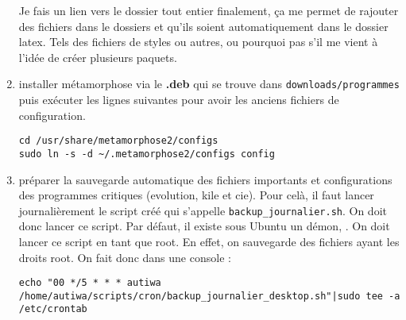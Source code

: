 \documentclass[a4paper,twoside]{article}
\begin{document}
\begin{enumerate}
\begin{remarque}
Je fais un lien vers le dossier tout entier finalement, ça me permet de rajouter des fichiers dans le dossiers et qu'ils soient automatiquement dans le dossier latex. Tels des fichiers de styles ou autres, ou pourquoi pas s'il me vient à l'idée de créer plusieurs paquets.
\end{remarque}
\item installer métamorphose via le \textbf{.deb} qui se trouve dans \texttt{downloads/programmes} puis exécuter les lignes suivantes pour avoir les anciens fichiers de configuration.
\begin{verbatim}
cd /usr/share/metamorphose2/configs
sudo ln -s -d ~/.metamorphose2/configs config
\end{verbatim}
\item préparer la sauvegarde automatique des fichiers importants et configurations des programmes critiques (evolution, kile et cie). Pour celà, il faut lancer journalièrement le script créé qui s'appelle \texttt{backup\_journalier.sh}. On doit donc lancer ce script. Par défaut, il existe sous Ubuntu un démon, . On doit lancer ce script en tant que root. En effet, on sauvegarde des fichiers ayant les droits root. On fait donc dans une console :

%

\begin{verbatim}
echo "00 */5 * * * autiwa /home/autiwa/scripts/cron/backup_journalier_desktop.sh"|sudo tee -a /etc/crontab
\end{verbatim}



\end{enumerate}
\end{document}
